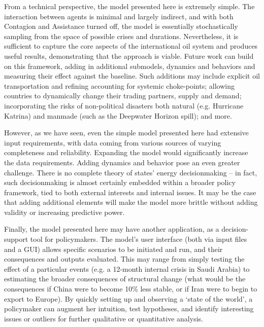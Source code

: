 \documentclass{llncs}
\begin{document}
From a technical perspective, the model presented here is extremely simple. The interaction between agents is minimal and largely indirect, and with both Contagion and Assistance turned off, the model is essentially stochastically sampling from the space of possible crises and durations. Nevertheless, it is sufficient to capture the core aspects of the international oil system and produces useful results, demonstrating that the approach is viable. Future work can build on this framework, adding in additional submodels, dynamics and behaviors and measuring their effect against the baseline. Such additions may include explicit oil transportation and refining accounting for systemic choke-points; allowing countries to dynamically change their trading partners, supply and demand; incorporating the risks of non-political disasters both natural (e.g. Hurricane Katrina) and manmade (such as the Deepwater Horizon spill); and more.

However, as we have seen, even the simple model presented here had extensive input requirements, with data coming from various sources of varying completeness and reliability. Expanding the model would significantly increase the data requirements. Adding dynamics and behavior pose an even greater challenge. There is no complete theory of states' energy decisionmaking -- in fact, such decisionmaking is almost certainly embedded within a broader policy framework, tied to both external interests and internal issues. It may be the case that adding additional elements will make the model more brittle without adding validity or increasing predictive power.

Finally, the model presented here may have another application, as a decision-support tool for policymakers. The model's user interface (both via input files and a GUI) allows specific scenarios to be initiated and run, and their consequences and outputs evaluated. This may range from simply testing the effect of a particular events (e.g. a 12-month internal crisis in Saudi Arabia) to estimating the broader consequences of structural change (what would be the consequences if China were to become 10\% less stable, or if Iran were to begin to export to Europe). By quickly setting up and observing a `state of the world', a policymaker can augment her intuition, test hypotheses, and identify interesting issues or outliers for further qualitative or quantitative analysis. 



\end{document}
